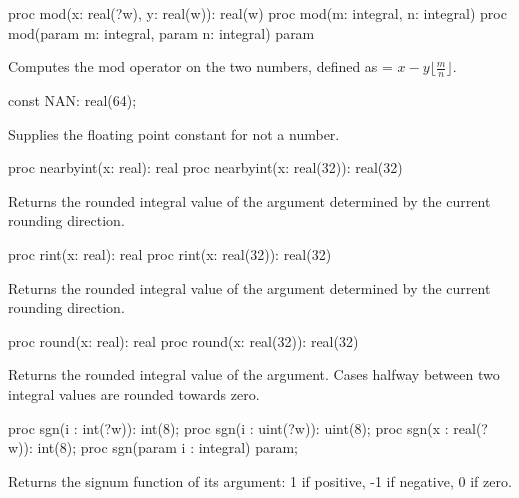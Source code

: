 \begin{protohead}
proc mod(x: real(?w), y: real(w)): real(w)
proc mod(m: integral, n: integral)
proc mod(param m: integral, param n: integral) param
\end{protohead}
\begin{protobody}
Computes the mod operator on the two numbers, defined as
 = $x - y \lfloor\frac{m}{n}\rfloor$.
\end{protobody}

\begin{protohead}
const NAN: real(64);
\end{protohead}
\begin{protobody}
Supplies the floating point constant for not a number.
\end{protobody}

\begin{protohead}
proc nearbyint(x: real): real
proc nearbyint(x: real(32)): real(32)
\end{protohead}
\begin{protobody}
Returns the rounded integral value of the argument determined by the
current rounding direction.
\end{protobody}

\begin{protohead}
proc rint(x: real): real
proc rint(x: real(32)): real(32)
\end{protohead}
\begin{protobody}
Returns the rounded integral value of the argument determined by the
current rounding direction.
\end{protobody}

\begin{protohead}
proc round(x: real): real
proc round(x: real(32)): real(32)
\end{protohead}
\begin{protobody}
Returns the rounded integral value of the argument.  Cases halfway
between two integral values are rounded towards zero.
\end{protobody}

\begin{protohead}
proc sgn(i : int(?w)):   int(8);
proc sgn(i : uint(?w)): uint(8);
proc sgn(x : real(?w)):  int(8);
proc sgn(param i : integral) param;
\end{protohead}
\begin{protobody}
Returns the signum function of its argument:
1 if positive, -1 if negative, 0 if zero.
\end{protobody}

